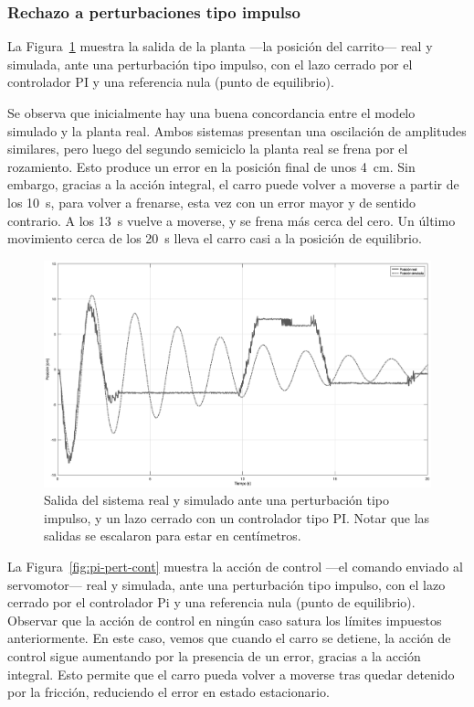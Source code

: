 \subsubsection{Rechazo a perturbaciones tipo impulso}

La Figura~\ref{fig:pi-pert-salida} muestra la salida de la planta ---la posición del carrito--- real y simulada, ante una perturbación tipo impulso, con el lazo cerrado por el controlador PI y una referencia nula (punto de equilibrio).

Se observa que inicialmente hay una buena concordancia entre el modelo simulado y la planta real. Ambos sistemas presentan una oscilación de amplitudes similares, pero luego del segundo semiciclo la planta real se frena por el rozamiento. Esto produce un error en la posición final de unos \qty{4}{\cm}. Sin embargo, gracias a la acción integral, el carro puede volver a moverse a partir de los \qty{10}{\s}, para volver a frenarse, esta vez con un error mayor y de sentido contrario. A los \qty{13}{\s} vuelve a moverse, y se frena más cerca del cero. Un último movimiento cerca de los \qty{20}{\s} lleva el carro casi a la posición de equilibrio.

\begin{figure}[!htbp]
    \centering
    \includegraphics[width=\linewidth]{img/pi-pert-salida.eps}
    \caption{Salida del sistema real y simulado ante una perturbación tipo impulso, y un lazo cerrado con un controlador tipo PI. Notar que las salidas se escalaron para estar en centímetros.}
    \label{fig:pi-pert-salida}
\end{figure}

La Figura~\ref{fig:pi-pert-cont} muestra la acción de control ---el comando enviado al servomotor--- real y simulada, ante una perturbación tipo impulso, con el lazo cerrado por el controlador Pi y una referencia nula (punto de equilibrio). Observar que la acción de control en ningún caso satura los límites impuestos anteriormente. En este caso, vemos que cuando el carro se detiene, la acción de control sigue aumentando por la presencia de un error, gracias a la acción integral. Esto permite que el carro pueda volver a moverse tras quedar detenido por la fricción, reduciendo el error en estado estacionario.

